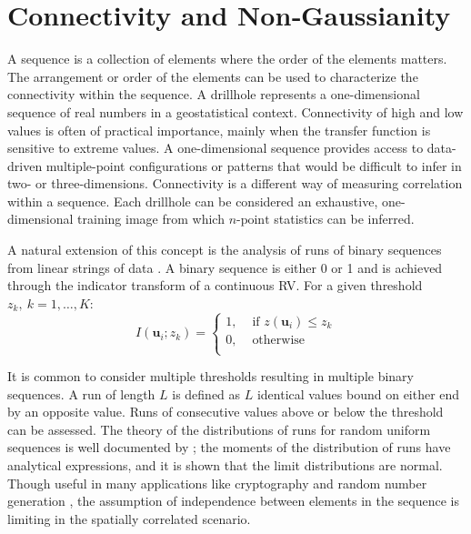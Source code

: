 \FloatBarrier
\section{Connectivity and Non‐Gaussianity}
\label{sec:03connect}

A sequence is a collection of elements where the order of the elements matters. The arrangement or order of the elements can be used to characterize the connectivity within the sequence. A drillhole represents a one-dimensional sequence of real numbers in a geostatistical context. Connectivity of high and low values is often of practical importance, mainly when the transfer function is sensitive to extreme values. A one-dimensional sequence provides access to data-driven multiple-point configurations or patterns that would be difficult to infer in two- or three-dimensions. Connectivity is a different way of measuring correlation within a sequence. Each drillhole can be considered an exhaustive, one-dimensional training image from which $n\text{-point}$ statistics can be inferred.

A natural extension of this concept is the analysis of runs of binary sequences from linear strings of data \citep{ortiz2003characterization}. A binary sequence is either 0 or 1 and is achieved through the indicator transform of a continuous \gls{RV}. For a given threshold $z_{k}, \ k=1,\dots,K$:
\begin{equation}
    I(\mathbf{u}_{i};z_{k}) =
    \begin{cases}
        1, & \text{ if }z(\mathbf{u}_{i}) \leq z_{k} \\
        0, & \text{ otherwise }                      \\
    \end{cases}
    \label{eq:indicator}
\end{equation}

It is common to consider multiple thresholds resulting in multiple binary sequences. A run of length $L$ is defined as $L$ identical values bound on either end by an opposite value. Runs of consecutive values above or below the threshold can be assessed. The theory of the distributions of runs for random uniform sequences is well documented by \cite{mood1940distribution}; the moments of the distribution of runs have analytical expressions, and it is shown that the limit distributions are normal. Though useful in many applications like cryptography and random number generation \citep{rukhin2010statistical}, the assumption of independence between elements in the sequence is limiting in the spatially correlated scenario.

